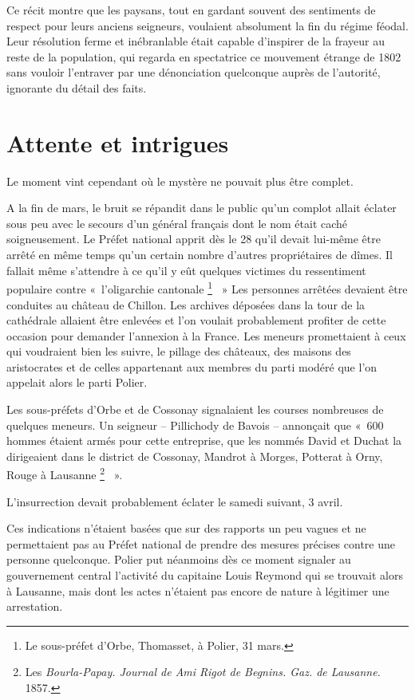 \documentclass[french,twoside]{book} %
\begin{document}
\noindent Ce récit montre que les paysans, tout en gardant souvent des sentiments de respect pour leurs anciens seigneurs, voulaient absolument la fin du régime féodal. Leur résolution ferme et inébranlable était capable d’inspirer de la frayeur au reste de la population, qui regarda en spectatrice ce mouvement étrange de 1802 sans vouloir l’entraver par une dénonciation quelconque auprès de l’autorité, ignorante du détail des faits.
\section[Attente et intrigues]{Attente et intrigues}
\noindent Le moment vint cependant où le mystère ne pouvait plus être complet.\par
A la fin de mars, le bruit se répandit dans le public qu’un complot allait éclater sous peu avec le secours d’un général français dont le nom était caché soigneusement. Le Préfet national apprit dès le 28 qu’il devait lui-même être arrêté en même temps qu’un certain nombre d’autres propriétaires de dîmes. Il fallait même s’attendre à ce qu’il y eût quelques victimes du ressentiment populaire contre « l’oligarchie cantonale \footnote{Le sous-préfet d’Orbe, Thomasset, à Polier, 31 mars.}  » Les personnes arrêtées devaient être conduites au château de Chillon. Les archives déposées dans la tour de la cathédrale allaient être enlevées et l’on voulait probablement profiter de cette occasion pour demander l’annexion à la France. Les meneurs promettaient à ceux qui voudraient bien les suivre, le pillage des châteaux, des maisons des aristocrates et de celles appartenant aux membres du parti modéré que l’on appelait alors le parti Polier.\par
Les sous-préfets d’Orbe et de Cossonay signalaient les courses nombreuses de quelques meneurs. Un seigneur – Pillichody de Bavois – annonçait que « 600 hommes étaient armés pour cette entreprise, que les nommés David et Duchat la dirigeaient dans le district de Cossonay, Mandrot à Morges, Potterat à Orny, Rouge à Lausanne \footnote{Les \emph{Bourla-Papay. Journal de Ami Rigot de Begnins. Gaz. de Lausanne.} 1857.}  ».\par
L’insurrection devait probablement éclater le samedi suivant, 3 avril.\par
Ces indications n’étaient basées que sur des rapports un peu vagues et ne permettaient pas au Préfet national de prendre des mesures précises contre une personne quelconque. Polier put néanmoins dès ce moment signaler au gouvernement central l’activité du capitaine Louis Reymond qui se trouvait alors à Lausanne, mais dont les actes n’étaient pas encore de nature à légitimer une arrestation.\par
\end{document}
